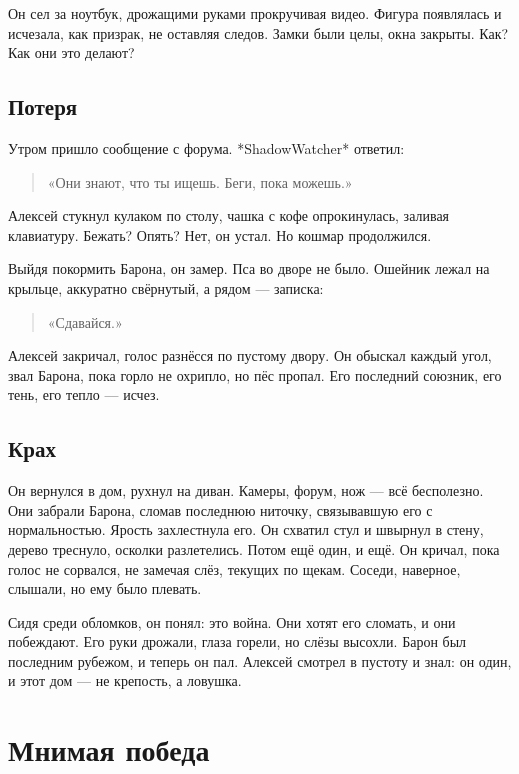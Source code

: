 \documentclass[12pt,a4paper]{book}
\begin{document}
Он сел за ноутбук, дрожащими руками прокручивая видео. Фигура появлялась и исчезала, как призрак, не оставляя следов. Замки были целы, окна закрыты. Как? Как они это делают?

\section{Потеря}

Утром пришло сообщение с форума. *ShadowWatcher* ответил:

\begin{quote}
«Они знают, что ты ищешь. Беги, пока можешь.»
\end{quote}

Алексей стукнул кулаком по столу, чашка с кофе опрокинулась, заливая клавиатуру. Бежать? Опять? Нет, он устал. Но кошмар продолжился.

Выйдя покормить Барона, он замер. Пса во дворе не было. Ошейник лежал на крыльце, аккуратно свёрнутый, а рядом — записка:

\begin{quote}
«Сдавайся.»
\end{quote}

Алексей закричал, голос разнёсся по пустому двору. Он обыскал каждый угол, звал Барона, пока горло не охрипло, но пёс пропал. Его последний союзник, его тень, его тепло — исчез.

\section{Крах}

Он вернулся в дом, рухнул на диван. Камеры, форум, нож — всё бесполезно. Они забрали Барона, сломав последнюю ниточку, связывавшую его с нормальностью. Ярость захлестнула его. Он схватил стул и швырнул в стену, дерево треснуло, осколки разлетелись. Потом ещё один, и ещё. Он кричал, пока голос не сорвался, не замечая слёз, текущих по щекам. Соседи, наверное, слышали, но ему было плевать.

Сидя среди обломков, он понял: это война. Они хотят его сломать, и они побеждают. Его руки дрожали, глаза горели, но слёзы высохли. Барон был последним рубежом, и теперь он пал. Алексей смотрел в пустоту и знал: он один, и этот дом — не крепость, а ловушка.

\chapter{Мнимая победа}
\end{document}
